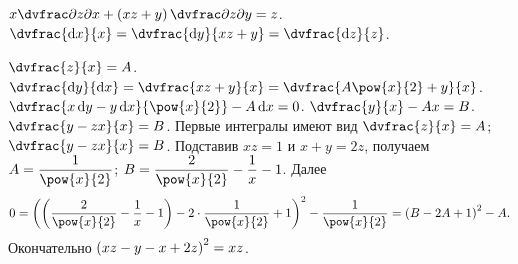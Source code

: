 \documentclass[a5paper,10pt]{article}
\begin{document}
    $x \vparder{z}{x} + \br{xz + y} \vparder{z}{y} = z$.
    $\dvfrac {\di x} {x}
    = \dvfrac {\di y} {xz + y}
    = \dvfrac {\di z} {z}$.

    $\dvfrac {z}{x} = A$.
    $\dvfrac {\di y}{\di x} = \dvfrac {xz + y}{x} = \dvfrac {A \pow{x}{2} + y}{x}$.
    $\dvfrac {x \di y - y \di x}{\pow{x}{2}} - A \di x = 0$.
    $\dvfrac {y}{x} - Ax = B$.
    $\dvfrac {y - zx}{x} = B$.
    Первые интегралы имеют вид
    $\dvfrac {z}{x} = A$;
    $\dvfrac {y - zx}{x} = B$.
    Подставив $xz = 1$ и $x + y = 2z$, получаем
    $A = \dfrac{1}{\pow{x}{2}}$;
    $B = \dfrac{2}{\pow{x}{2}} - \dfrac{1}{x} - 1$.
    Далее
    $$0 = \br{\br{\dfrac{2}{\pow{x}{2}} - \dfrac{1}{x} - 1} 
        - 2 \cdot \dfrac{1}{\pow{x}{2}} + 1}^2 - \dfrac{1}{\pow{x}{2}}
    = \br{B - 2A + 1}^2 - A.$$
    Окончательно
    $\left(\hspace{0.01em}xz - y - x + 2z\hspace{0.01em}\right)^2 = xz$.
\end{document}
